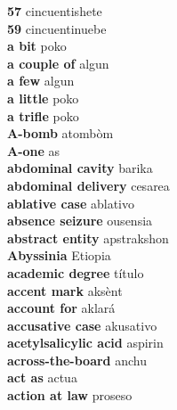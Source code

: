 \textbf{ 57  } cincuentishete \\
\textbf{ 59  } cincuentinuebe \\
\textbf{ a bit  } poko \\
\textbf{ a couple of  } algun \\
\textbf{ a few  } algun \\
\textbf{ a little  } poko \\
\textbf{ a trifle  } poko \\
\textbf{ A-bomb  } atombòm \\
\textbf{ A-one  } as \\
\textbf{ abdominal cavity  } barika \\
\textbf{ abdominal delivery  } cesarea \\
\textbf{ ablative case  } ablativo \\
\textbf{ absence seizure  } ousensia \\
\textbf{ abstract entity  } apstrakshon \\
\textbf{ Abyssinia  } Etiopia \\
\textbf{ academic degree  } título \\
\textbf{ accent mark  } aksènt \\
\textbf{ account for  } aklará \\
\textbf{ accusative case  } akusativo \\
\textbf{ acetylsalicylic acid  } aspirin \\
\textbf{ across-the-board  } anchu \\
\textbf{ act as  } actua \\
\textbf{ action at law  } proseso \\
